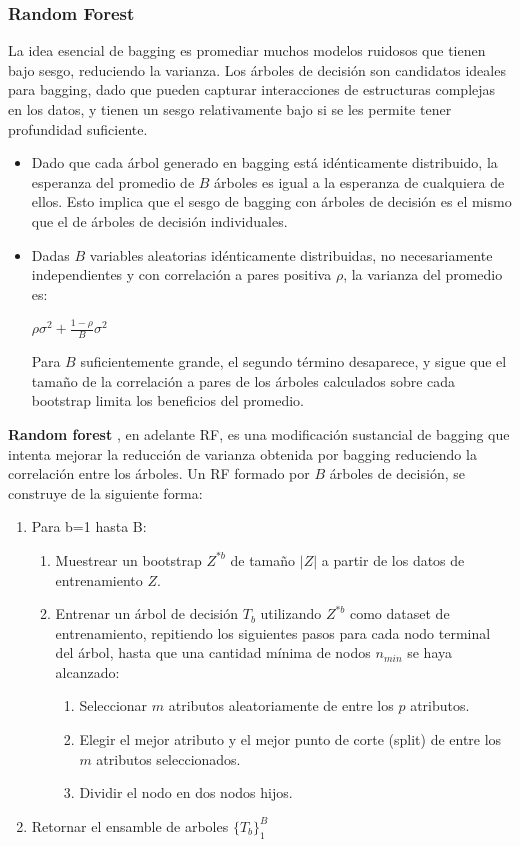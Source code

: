 \subsubsection{Random Forest}

La idea esencial de bagging es promediar muchos modelos ruidosos que tienen bajo sesgo, reduciendo la varianza. Los árboles de decisión son candidatos ideales para bagging, dado que pueden capturar interacciones de estructuras complejas en los datos, y tienen un sesgo relativamente bajo si se les permite tener profundidad suficiente. 

\begin{itemize}
\item Dado que cada árbol generado en bagging está idénticamente distribuido, la esperanza del promedio de $B$ árboles es igual a la esperanza de cualquiera de ellos. Esto implica que el sesgo de bagging con árboles de decisión es el mismo que el de árboles de decisión individuales.
\item Dadas $B$ variables aleatorias idénticamente distribuidas, no necesariamente independientes y con correlación a pares positiva $\rho$, la varianza del promedio es:

\begin{center}
$\rho \sigma^2 + \frac{1-\rho}{B} \sigma^2$
\end{center}

Para $B$ suficientemente grande, el segundo término desaparece, y sigue que el tamaño de la correlación a pares de los árboles calculados sobre cada bootstrap limita los beneficios del promedio.
\end{itemize}

\textbf{Random forest} \cite{rf}, en adelante RF, es una modificación sustancial de bagging que intenta mejorar la reducción de varianza obtenida por bagging reduciendo la correlación entre los árboles. Un RF formado por $B$ árboles de decisión, se construye de la siguiente forma:

\begin{enumerate}
\item Para b=1 hasta B:
\begin{enumerate}
\item Muestrear un bootstrap $Z^{*b}$ de tamaño $|Z|$ a partir de los datos de entrenamiento $Z$.
\item Entrenar un árbol de decisión $T_b$ utilizando $Z^{*b}$ como dataset de entrenamiento, repitiendo los siguientes pasos para cada nodo terminal del árbol, hasta que una cantidad mínima de nodos $n_{min}$ se haya alcanzado:
\begin{enumerate}
\item Seleccionar $m$ atributos aleatoriamente de entre los $p$ atributos.
\item Elegir el mejor atributo y el mejor punto de corte (split) de entre los $m$ atributos seleccionados.
\item Dividir el nodo en dos nodos hijos.
\end{enumerate}
\end{enumerate}
\item Retornar el ensamble de arboles $\{ T_b \}^B_1$
\end{enumerate}

